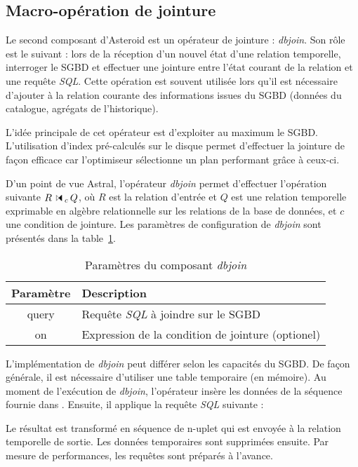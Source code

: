 \subsection{Macro-opération de jointure}
Le second composant d'Asteroid est un opérateur de jointure : \textit{dbjoin}. Son rôle est le suivant : lors de la réception d'un nouvel état d'une relation temporelle, interroger le SGBD et effectuer une jointure entre l'état courant de la relation et une requête \textit{SQL}. Cette opération est souvent utilisée lors qu'il est nécessaire d'ajouter à la relation courante des informations issues du SGBD (données du catalogue, agrégats de l'historique).

L'idée principale de cet opérateur est d'exploiter au maximum le SGBD. L'utilisation d'index pré-calculés sur le disque permet d'effectuer la jointure de façon efficace car l'optimiseur sélectionne un plan performant grâce à ceux-ci.

D'un point de vue Astral, l'opérateur \textit{dbjoin} permet d'effectuer l'opération suivante $R \ssjoin_c Q$, où $R$ est la relation d'entrée et $Q$ est une relation temporelle exprimable en algèbre relationnelle sur les relations de la base de données, et $c$ une condition de jointure. Les paramètres de configuration de \textit{dbjoin} sont présentés dans la table~\ref{tab:contrib:asteroid:dbjoin}.
\begin{table}[ht]
    \centering
    \begin{tabular}{cl}
        Paramètre & Description \\ \midrule
        query & Requête \textit{SQL} à joindre sur le SGBD \\
        on & Expression de la condition de jointure (optionel)
    \end{tabular}
    \caption{Paramètres du composant \textit{dbjoin}}\label{tab:contrib:asteroid:dbjoin}
\end{table}

L'implémentation de \textit{dbjoin} peut différer selon les capacités du SGBD. De façon générale, il est nécessaire d'utiliser une table temporaire  (en mémoire). Au moment de l'exécution de \textit{dbjoin}, l'opérateur insère les données de la séquence fournie dans . Ensuite, il applique la requête \textit{SQL} suivante : \begin{center}  \end{center}
Le résultat est transformé en séquence de n-uplet qui est envoyée à la relation temporelle de sortie. Les données temporaires sont supprimées ensuite. Par mesure de performances, les requêtes sont préparés à l'avance.

